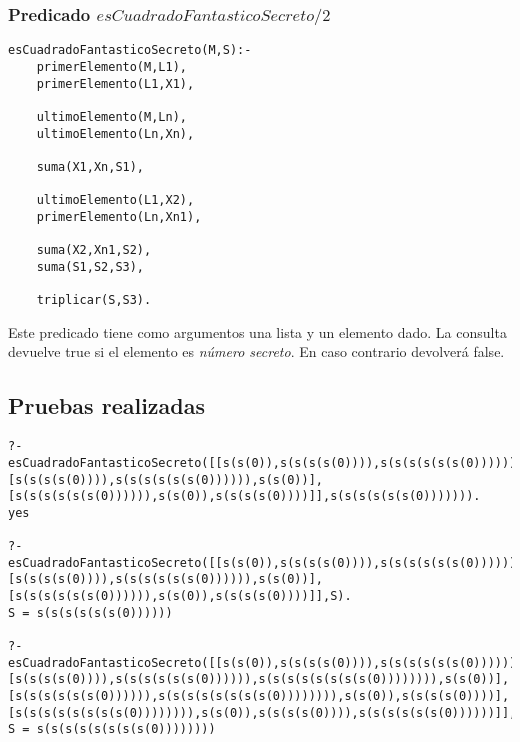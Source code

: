 \documentclass[11pt, a4paper]{article}
\begin{document}
\subsubsection{Predicado $esCuadradoFantasticoSecreto/2$}
\begin{lstlisting}[frame=single]
esCuadradoFantasticoSecreto(M,S):-
	primerElemento(M,L1),
	primerElemento(L1,X1),
	
	ultimoElemento(M,Ln),
	ultimoElemento(Ln,Xn),
	
	suma(X1,Xn,S1),
	
	ultimoElemento(L1,X2),
	primerElemento(Ln,Xn1),
	
	suma(X2,Xn1,S2),
	suma(S1,S2,S3),
	
	triplicar(S,S3).
\end{lstlisting}
Este predicado tiene como argumentos una lista y un elemento dado.
La consulta devuelve true si el elemento es \textit{número secreto}. En caso contrario devolverá false.
\subsection{Pruebas realizadas}
\begin{lstlisting}[frame=single]
?-esCuadradoFantasticoSecreto([[s(s(0)),s(s(s(s(0)))),s(s(s(s(s(s(0))))))],[s(s(s(s(0)))),s(s(s(s(s(s(0)))))),s(s(0))],[s(s(s(s(s(s(0)))))),s(s(0)),s(s(s(s(0))))]],s(s(s(s(s(s(0))))))).
yes

?-esCuadradoFantasticoSecreto([[s(s(0)),s(s(s(s(0)))),s(s(s(s(s(s(0))))))],[s(s(s(s(0)))),s(s(s(s(s(s(0)))))),s(s(0))],[s(s(s(s(s(s(0)))))),s(s(0)),s(s(s(s(0))))]],S).
S = s(s(s(s(s(s(0))))))

?-esCuadradoFantasticoSecreto([[s(s(0)),s(s(s(s(0)))),s(s(s(s(s(s(0)))))),s(s(s(s(s(s(s(s(0))))))))],[s(s(s(s(0)))),s(s(s(s(s(s(0)))))),s(s(s(s(s(s(s(s(0)))))))),s(s(0))],[s(s(s(s(s(s(0)))))),s(s(s(s(s(s(s(s(0)))))))),s(s(0)),s(s(s(s(0))))],[s(s(s(s(s(s(s(s(0)))))))),s(s(0)),s(s(s(s(0)))),s(s(s(s(s(s(0))))))]],S).
S = s(s(s(s(s(s(s(s(0))))))))
\end{lstlisting}
\end{document}
